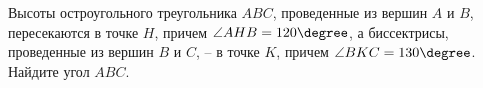 \begin{ex}
	\begin{condition}
		Высоты остроугольного треугольника \( ABC \), проведенные из вершин \( A  \) и \( B \), пересекаются в точке \( H \), причем \( \angle AHB = 120\degree \), а биссектрисы, проведенные из вершин \( B \) и \( C \), – в точке \( K \), причем \( \angle BKC = 130\degree \). Найдите угол \( ABC \).
	\end{condition}
\end{ex}